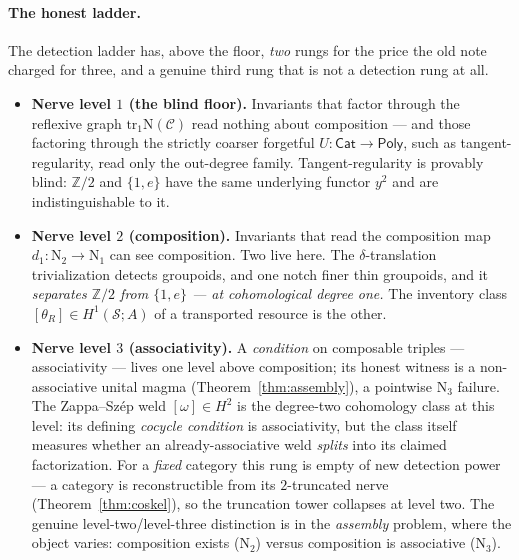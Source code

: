 \documentclass[11pt]{article}
\theoremstyle{definition}
\newcommand{\Poly}{\mathsf{Poly}}
\newcommand{\Cat}{\mathsf{Cat}}
\newcommand{\tr}{\mathrm{tr}}
\newcommand{\Z}{\mathbb{Z}}
\newcommand{\sS}{\mathcal{S}}
\newcommand{\cC}{\mathcal{C}}
\newcommand{\Nerve}{\mathrm{N}}
\begin{document}
\paragraph{The honest ladder.}
The detection ladder has, above the floor, \emph{two} rungs for the price the old note charged for
three, and a genuine third rung that is not a detection rung at all.
\begin{itemize}
\item \textbf{Nerve level $1$ (the blind floor).} Invariants that factor through the reflexive graph
$\tr_1\Nerve(\cC)$ read nothing about composition --- and those factoring through the strictly coarser
forgetful $U\colon\Cat\to\Poly$, such as tangent-regularity, read only the out-degree family.
Tangent-regularity is provably blind: $\Z/2$ and $\{1,e\}$ have the same underlying functor $y^2$ and
are indistinguishable to it.
\item \textbf{Nerve level $2$ (composition).} Invariants that read the composition map
$d_1\colon\Nerve_2\to\Nerve_1$ can see composition. Two live here. The $\delta$-translation
trivialization detects groupoids, and one notch finer thin groupoids, and it \emph{separates $\Z/2$
from $\{1,e\}$ --- at cohomological degree one.} The inventory class $[\theta_R]\in H^1(\sS;A)$ of a
transported resource is the other.
\item \textbf{Nerve level $3$ (associativity).} A \emph{condition} on composable triples ---
associativity --- lives one level above composition; its honest witness is a non-associative unital
magma (Theorem~\ref{thm:assembly}), a pointwise $\Nerve_3$ failure. The Zappa--Sz\'ep weld
$[\omega]\in H^2$ is the degree-two cohomology class at this level: its defining \emph{cocycle
condition} is associativity, but the class itself measures whether an already-associative weld
\emph{splits} into its claimed factorization. For a \emph{fixed} category this rung is empty of new
detection power --- a category is reconstructible from its $2$-truncated nerve
(Theorem~\ref{thm:coskel}), so the truncation tower collapses at level two.
The genuine level-two/level-three distinction is in the \emph{assembly} problem, where the object
varies: composition exists ($\Nerve_2$) versus composition is associative ($\Nerve_3$).
\end{itemize}
\end{document}
